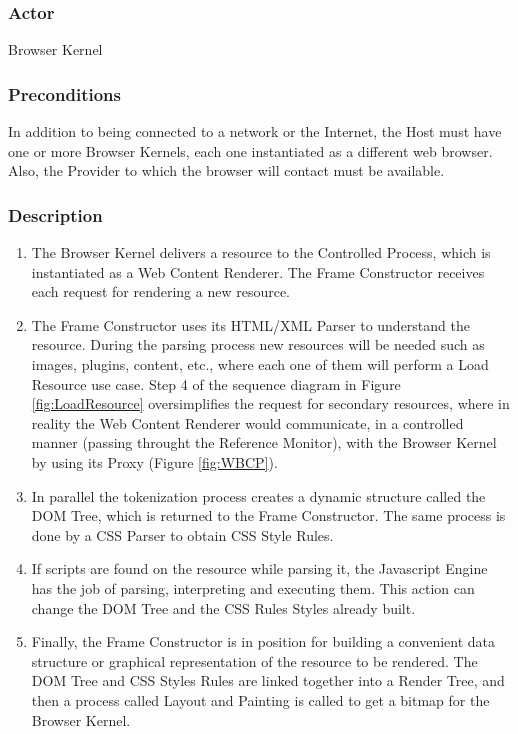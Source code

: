\documentclass[prodmode,acmtecs]{acmsmall}
\begin{document}
    \subsubsection*{Actor} Browser Kernel
    \subsubsection*{Preconditions} In addition to being connected to a network or the Internet, the Host must have one or more Browser Kernels, each one instantiated as a different web browser. Also, the Provider to which the browser will contact must be available. 

    \subsubsection*{Description}
      \begin{enumerate}\leftskip2.5em
        \item The Browser Kernel delivers a resource to the Controlled Process, which is instantiated as a Web Content Renderer. The Frame Constructor receives each request for rendering a new resource.
        \item The Frame Constructor uses its HTML/XML Parser to understand the resource. During the parsing process new resources will be needed such as images, plugins, content, etc., where each one of them will perform a Load Resource use case. Step 4 of the sequence diagram in Figure \ref{fig:LoadResource} oversimplifies the request for secondary resources, where in reality the Web Content Renderer would communicate, in a controlled manner (passing throught the Reference Monitor), with the Browser Kernel by using its Proxy (Figure \ref{fig:WBCP}).
        \item In parallel the tokenization process creates a dynamic structure called the DOM Tree, which is returned to the Frame Constructor. The same process is done by a CSS Parser to obtain CSS Style Rules.
        \item If scripts are found on the resource while parsing it, the Javascript Engine has the job of parsing, interpreting and executing them. This action can change the DOM Tree and the CSS Rules Styles already built.
        \item Finally, the Frame Constructor is in position for building a convenient data structure or graphical representation of the resource to be rendered. The DOM Tree and CSS Styles Rules are linked together into a Render Tree, and then a process called Layout and Painting is called to get a bitmap \cite{gpuchrome,gecko2} for the Browser Kernel.
      \end{enumerate}
\end{document}
